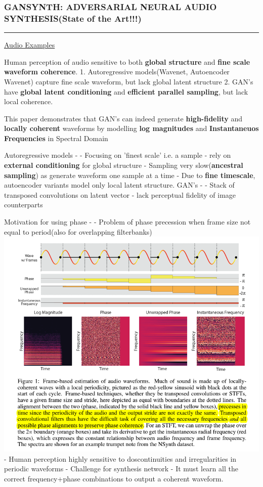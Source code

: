 \documentclass[11pt]{article}
\makeatletter
\def\maxwidth{\ifdim\Gin@nat@width>\linewidth\linewidth
    \else\Gin@nat@width\fi}
\let\Oldincludegraphics\includegraphics
\renewcommand{\includegraphics}[1]{\Oldincludegraphics[width=.8\maxwidth]{#1}}
\makeatother
\begin{document}
\subsubsection{GANSYNTH: ADVERSARIAL NEURAL AUDIO SYNTHESIS(State of the
Art!!!)}\label{gansynth-adversarial-neural-audio-synthesisstate-of-the-art}

\begin{center}\rule{0.5\linewidth}{\linethickness}\end{center}

\href{https://storage.googleapis.com/magentadata/papers/gansynth/index.html}{Audio
Examples}

    Human perception of audio sensitive to both \textbf{global structure}
and \textbf{fine scale waveform coherence}. 1. Autoregressive
models(Wavenet, Autoencoder Wavenet) capture fine scale waveform, but
lack global latent structure 2. GAN's have \textbf{global latent
conditioning} and \textbf{efficient parallel sampling}, but lack local
coherence.

This paper demonstrates that GAN's can indeed generate
\textbf{high-fidelity} and \textbf{locally coherent} waveforms by
modelling \textbf{log magnitudes} and \textbf{Instantaneuos Frequencies}
in Spectral Domain

    Autoregressive models - - Focusing on 'finest scale' i.e. a sample -
rely on \textbf{external conditioning} for global structure - Sampling
very slow(\textbf{ancestral sampling}) as generate waveform one sample
at a time - Due to \textbf{fine timescale}, autoencoder variants model
only local latent structure. GAN's - - Stack of transposed convolutions
on latent vector - lack perceptual fidelity of image counterparts

Motivation for using phase - - Problem of phase precession when frame
size not equal to period(also for overlapping filterbanks)
\includegraphics{fig_01.PNG} - Human perception highly sensitive to
doscontinuities and irregularities in periodic waveforms - Challenge for
synthesis network - It must learn all the correct frequency+phase
combinations to output a coherent waveform.
\end{document}
